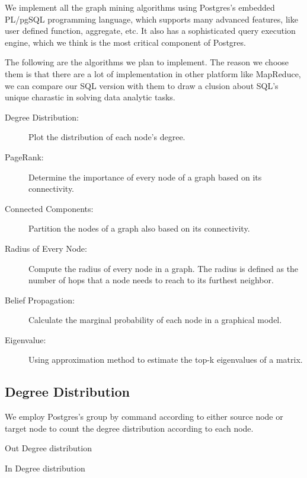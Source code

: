 We implement all the graph mining algorithms using Postgres's embedded PL/pgSQL programming language, which supports many advanced features, like user defined function, aggregate, etc. It also has a sophisticated query execution engine, which we think is the most critical component of Postgres.

The following are the algorithms we plan to implement. The reason we choose them is that there are a lot of implementation in other platform like MapReduce, we can compare our SQL version with them to draw a clusion about SQL's unique charastic in solving data analytic tasks.

\begin{description}
  \item[Degree Distribution:] Plot the distribution of each node's degree. 
  \item[PageRank:] Determine the importance of every node of a graph based on its connectivity. 
  \item[Connected Components:] Partition the nodes of a graph also based on its connectivity.
  \item[Radius of Every Node:] Compute the radius of every node in a graph. The radius is defined as the number of hops that a node needs to reach to its furthest neighbor.
  \item[Belief Propagation:] Calculate the marginal probability of each node in a graphical model. 
  \item[Eigenvalue:] Using approximation method to estimate the top-k eigenvalues of a matrix.
\end{description}

\subsection{Degree Distribution}
We employ Postgres's group by command according to either source node or target node to count the degree distribution according to each node. 

\begin{algorithm}
\caption{Out Degree distribution}
\begin{algorithmic}
\end{algorithmic}
\end{algorithm}

\begin{algorithm}
\caption{In Degree distribution}
\begin{algorithmic}
\end{algorithmic}
\end{algorithm}

